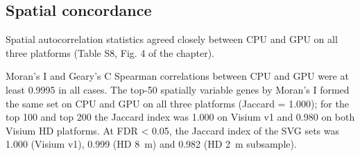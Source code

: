 \documentclass[runningheads]{llncs}
\begin{document}
\hypertarget{spatial-concordance}{%
\subsection{Spatial concordance}\label{spatial-concordance}}

Spatial autocorrelation statistics agreed closely between CPU and GPU on all three platforms (Table S8, Fig. 4 of the chapter).

Moran's I and Geary's C Spearman correlations between CPU and GPU were at least 0.9995 in all cases.
The top-50 spatially variable genes by Moran's I formed the same set on CPU and GPU on all three platforms (Jaccard = 1.000); for the top 100 and top 200 the Jaccard index was 1.000 on Visium v1 and 0.980 on both Visium HD platforms.
At FDR \textless{} 0.05, the Jaccard index of the SVG sets was 1.000 (Visium v1), 0.999 (HD 8~\textmu{}m) and 0.982 (HD 2~\textmu{}m subsample).
\end{document}
